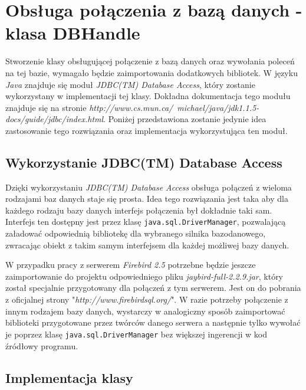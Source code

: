 \section{Obsługa połączenia z bazą danych - klasa DBHandle}

Stworzenie klasy obsługującej połączenie z bazą danych oraz wywołania poleceń na tej bazie, wymagało będzie zaimportowania dodatkowych bibliotek. W języku \emph{Java} znajduje się moduł \emph{ JDBC(TM) Database Access}, który zostanie wykorzystany w implementacji tej klasy. Dokładna dokumentacja tego modułu znajduje się na stronie \emph{http://www.cs.mun.ca/~michael/java/jdk1.1.5-docs/guide/jdbc/index.html}. Poniżej przedstawiona zostanie jedynie idea zastosowanie tego rozwiązania oraz implementacja wykorzystująca ten moduł.
\subsection{Wykorzystanie JDBC(TM) Database Access}

Dzięki wykorzystaniu \emph{ JDBC(TM) Database Access} \cite{Dokumentacja_Jaybird} obsługa połączeń z wieloma rodzajami baz danych staje się prosta. Idea tego rozwiązania jest taka aby dla każdego rodzaju bazy danych interfejs połączenia był dokładnie taki sam. Interfejs ten dostępny jest przez klasę \texttt{java.sql.DriverManager}, pozwalającą załadować odpowiednią bibliotekę dla wybranego silnika bazodanowego, zwracając obiekt z takim samym interfejsem dla każdej możliwej bazy danych. 
\par
W przypadku pracy z serwerem \emph{Firebird 2.5} potrzebne będzie jeszcze zaimportowanie do projektu odpowiedniego pliku \emph{jaybird-full-2.2.9.jar}, który został specjalnie przygotowany dla połączeń z tym serwerem. Jest on do pobrania z oficjalnej strony "\emph{http://www.firebirdsql.org/}". W razie potrzeby połączenie z innym rodzajem bazy danych, wystarczy w analogiczny sposób zaimportować biblioteki przygotowane przez twórców danego serwera a następnie tylko wywołać je poprzez klasę \texttt{java.sql.DriverManager} bez większej ingerencji w kod źródłowy programu.

\subsection{Implementacja klasy}


